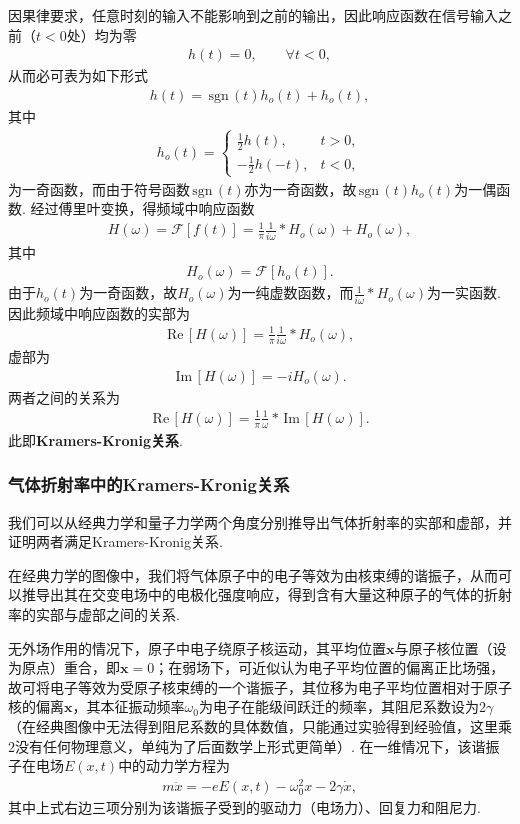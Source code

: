 \documentclass[a4paper, 10pt]{article}
\providecommand{\re}{\,\text{Re}\,} %
\providecommand{\im}{\,\text{Im}\,} %
\providecommand{\sgn}{\,\text{sgn}\,} %
\newcounter{subsubsubsection}[subsubsection]
\begin{document}
\begin{multicols*}{2}
因果律要求，任意时刻的输入不能影响到之前的输出，因此响应函数在信号输入之前（$t<0$处）均为零
\begin{align}
    h(t)=0,\qquad\forall t<0,
\end{align}
从而必可表为如下形式
\begin{align}
    h(t)=\sgn(t)h_o(t)+h_o(t),
\end{align}
其中
\begin{align}
    h_o(t)=\left\{\begin{array}{ll}
        \frac{1}{2}h(t),&t>0,\\
        -\frac{1}{2}h(-t),&t<0,
    \end{array}\right.
\end{align}
为一奇函数，而由于符号函数$\sgn(t)$亦为一奇函数，故$\sgn(t)h_o(t)$为一偶函数. 经过傅里叶变换，得频域中响应函数
\begin{align}
    H(\omega)=\mathscr{F}[f(t)]=\frac{1}{\pi}\frac{1}{i\omega}*H_o(\omega)+H_o(\omega),
\end{align}
其中
\begin{align}
    H_o(\omega)=\mathscr{F}[h_o(t)].
\end{align}
由于$h_o(t)$为一奇函数，故$H_o(\omega)$为一纯虚数函数，而$\frac{1}{i\omega}*H_o(\omega)$为一实函数. 因此频域中响应函数的实部为
\begin{align}
    \re[H(\omega)]=\frac{1}{\pi}\frac{1}{i\omega}*H_o(\omega),
\end{align}
虚部为
\begin{align}
    \im[H(\omega)]=-iH_o(\omega).
\end{align}
两者之间的关系为
\begin{align}
    \boxed{\re[H(\omega)]=\frac{1}{\pi}\frac{1}{\omega}*\im[H(\omega)].}
\end{align}
此即\textbf{Kramers-Kronig关系}.

\subsubsection{气体折射率中的Kramers-Kronig关系}
我们可以从经典力学和量子力学两个角度分别推导出气体折射率的实部和虚部，并证明两者满足Kramers-Kronig关系.

在经典力学的图像中，我们将气体原子中的电子等效为由核束缚的谐振子，从而可以推导出其在交变电场中的电极化强度响应，得到含有大量这种原子的气体的折射率的实部与虚部之间的关系.

无外场作用的情况下，原子中电子绕原子核运动，其平均位置$\bm{x}$与原子核位置（设为原点）重合，即$\bm{x}=0$；在弱场下，可近似认为电子平均位置的偏离正比场强，故可将电子等效为受原子核束缚的一个谐振子，其位移为电子平均位置相对于原子核的偏离$\bm{x}$，其本征振动频率$\omega_0$为电子在能级间跃迁的频率，其阻尼系数设为$2\gamma$（在经典图像中无法得到阻尼系数的具体数值，只能通过实验得到经验值，这里乘$2$没有任何物理意义，单纯为了后面数学上形式更简单）. 在一维情况下，该谐振子在电场$E(x,t)$中的动力学方程为
\begin{align}
    \label{motion-equ}
    m\ddot{x}=-eE(x,t)-\omega_0^2x-2\gamma\dot{x},
\end{align}
其中上式右边三项分别为该谐振子受到的驱动力（电场力）、回复力和阻尼力.


\end{multicols*}
\end{document}
